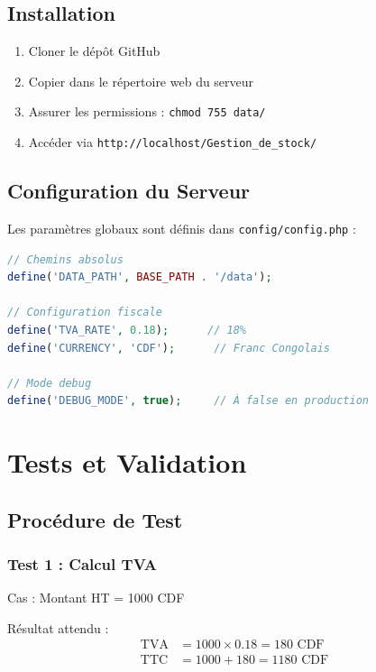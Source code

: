 \documentclass[12pt,a4paper]{report}
\begin{document}
\section{Installation}

\begin{enumerate}
    \item Cloner le dépôt GitHub
    \item Copier dans le répertoire web du serveur
    \item Assurer les permissions : \texttt{chmod 755 data/}
    \item Accéder via \texttt{http://localhost/Gestion\_de\_stock/}
\end{enumerate}

\section{Configuration du Serveur}

Les paramètres globaux sont définis dans \texttt{config/config.php} :

\begin{lstlisting}[language=PHP]
// Chemins absolus
define('DATA_PATH', BASE_PATH . '/data');

// Configuration fiscale
define('TVA_RATE', 0.18);      // 18%
define('CURRENCY', 'CDF');      // Franc Congolais

// Mode debug
define('DEBUG_MODE', true);     // À false en production
\end{lstlisting}

\pagebreak

\chapter{Tests et Validation}

\section{Procédure de Test}

\subsection{Test 1 : Calcul TVA}

Cas : Montant HT = 1000 CDF

Résultat attendu :
\begin{align*}
\text{TVA} &= 1000 \times 0.18 = 180 \text{ CDF} \\
\text{TTC} &= 1000 + 180 = 1180 \text{ CDF}
\end{align*}
\end{document}
